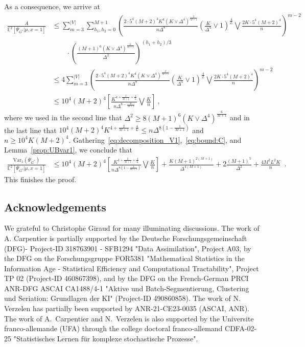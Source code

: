\documentclass{article}
\begin{document}
As a consequence, we arrive at 
\begin{align*}
\frac{A}{\mathbb E^2[\overline{\Psi}_{G^*}|\mu,x=1]}
&\leq \sum_{m=3}^{|V|} \sum_{h_1,h_2=0}^{M+1}
  \left(\frac{2\cdot 5^{4}(M+2)^4 K^{4} (K\vee \Delta^4)^{\tfrac{2}{M+1}}}{n\Delta^8} \left(\frac{K}{\Delta^4}\vee 1 \right)^{\tfrac{4}{L}} \bigvee \frac{2K\cdot 5^4 (M+2)^{4}}{n}\right)^{m-2}  \\ & \quad \quad \cdot \left(\frac{(M+1)^6 (K\vee \Delta^4)^{\tfrac{6}{M+1}}}{\Delta^{2}} \right)^{(h_1+h_2)/3} \\
  &\leq  4 \sum_{m=3}^{|V|}
  \left(\frac{2\cdot 5^{4}(M+2)^4 K^{4}(K\vee \Delta^4)^{\tfrac{2}{M+1}}}{n\Delta^8} \left(\frac{K}{\Delta^4}\vee 1 \right)^{\tfrac{4}{L}}\bigvee \frac{2K\cdot 5^4 (M+2)^{4}}{n} \right)^{m-2}  \\ 
  &\leq 10^4(M+2)^4 \left[\frac{ K^{4+\tfrac{2}{M+1}+ \tfrac{4}{L}}}{n\Delta^{8- \tfrac{8}{M+1}}}\bigvee \frac{K}{n}\right] \ , 
\end{align*}
where we used in the second line that $\Delta^2 \geq 8(M+1)^6 (K\vee \Delta^4)^{\tfrac{6}{M+1}}$ and in the last line that $ 10^4 (M+2)^4 K^{4+\tfrac{2}{M+1}+\tfrac{4}{L} }\leq n\Delta^{8(1-\tfrac{1}{M+1})}$ and $n\geq 10^{4} K (M+2)^4$. 
Gathering~\eqref{eq:decomposition_V1},~\eqref{eq:bound:C}, and Lemma~\ref{prop:UBvar1}, we conclude that 
\begin{align*}
\frac{\mathrm{Var}_1(\overline{\Psi}_{G^*})}{\mathbb E^2[\overline{\Psi}_{G^*}|\mu,x=1] }&\leq 10^4(M+2)^4   \left[\frac{ K^{4+\tfrac{2}{M+1}+ \tfrac{4}{L}}}{n\Delta^{8(1-\tfrac{1}{M+1})}}\bigvee \frac{K}{n}\right]+ \frac{K(M+1)^{2(M+1)}}{\Delta^{4(M+1)}} + 2  \frac{(M+1)^{5}}{\Delta^{2}}  +  \frac{4M^2L   ^2K}{n}\enspace . 
\end{align*}
This finishes the proof.




\subsection*{Acknowledgements}
We grateful to Christophe Giraud for many illuminating discussions. The work of A. Carpentier is partially supported by the Deutsche Forschungsgemeinschaft (DFG)- Project-ID 318763901 - SFB1294 "Data Assimilation", Project A03,  by the DFG on the Forschungsgruppe FOR5381 "Mathematical Statistics in the Information Age - Statistical Efficiency and Computational Tractability", Project TP 02 (Project-ID 460867398), and by  the DFG on the French-German PRCI ANR-DFG ASCAI CA1488/4-1 "Aktive und Batch-Segmentierung, Clustering und Seriation: Grundlagen der KI" (Project-ID 490860858). The work of N. Verzelen has  partially been supported by ANR-21-CE23-0035 (ASCAI, ANR). The work of A.~Carpentier and N.~Verzelen is also supported by the Universite franco-allemande (UFA) through the college doctoral franco-allemand CDFA-02-25 "Statistisches Lernen für komplexe stochastische Prozesse".
\end{document}
